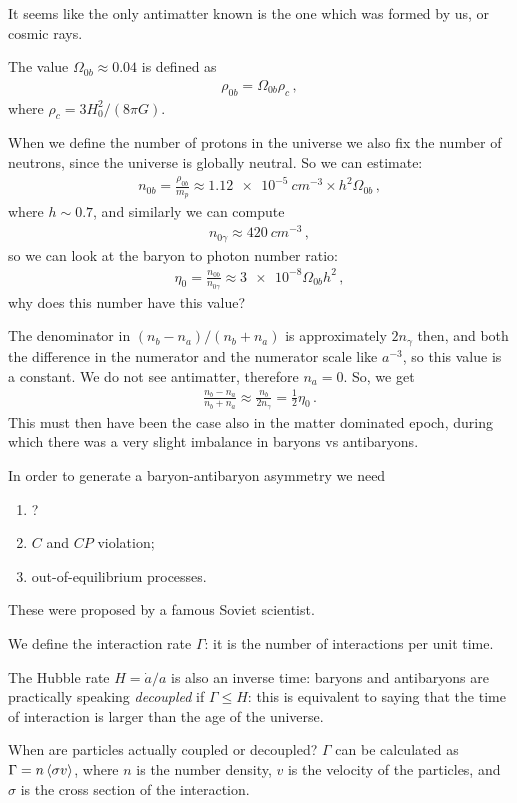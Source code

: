 \documentclass[main.tex]{subfiles}
\begin{document}
It seems like the only antimatter known is the one which was formed by us, or cosmic rays.

The value \(\Omega_{0b} \approx 0.04\) is defined as 
%
\begin{align}
  \rho_{0b} = \Omega_{0b} \rho _{c} 
\,,
\end{align}
%
where \(\rho_c = 3 H_0^2 / (8 \pi G)\).

When we define the number of protons in the universe we also fix the number of neutrons, since the universe is globally neutral.
So we can estimate: 
%
\begin{align}
  n_{0b} = \frac{\rho_{0b}}{m_p} \approx \SI{1.12e-5}{cm^{-3}} \times h^2 \Omega_{0b}
\,,
\end{align}
%
where \(h \sim 0.7\),
and similarly we can compute 
%
\begin{align}
  n_{0 \gamma } \approx \SI{420}{cm^{-3}}
\,,
\end{align}
%
so we can 
look at the baryon to photon number ratio: 
%
\begin{align}
  \eta_0  = \frac{n_{0b}}{n_{0\gamma}}
  \approx \num{3e-8} \Omega_{0b} h^2
\,,
\end{align}
%
why does this number have this value? 

The denominator in \((n_b - n_a) / (n_b + n_a)\) is approximately \(2 n_{\gamma }\) then, and both the difference in the numerator and the numerator scale like \(a^{-3}\), so this value is a constant.
We do not see antimatter, therefore \(n_a = 0\). So, we get 
%
\begin{align}
    \frac{n_b - n_a}{n_b + n_a} \approx \frac{n_b}{2 n_\gamma } = \frac{1}{2} \eta_0 
\,.
\end{align}
%
This must then have been the case also in the matter dominated epoch, during which there was a very slight imbalance in baryons vs antibaryons.

In order to generate a baryon-antibaryon asymmetry we need \begin{enumerate}
    \item ?
    \item \(C\) and \(CP\) violation;
    \item out-of-equilibrium processes.
\end{enumerate}

These were proposed by a famous Soviet scientist.

We define the interaction rate \(\Gamma \): it is the number of interactions per unit time.

The Hubble rate \(H = \dot{a} / a \) is also an inverse time: baryons and antibaryons are practically speaking \emph{decoupled} if \(\Gamma \leq H\): this is equivalent to saying that the time of interaction is larger than the age of the universe.

When are particles actually coupled or decoupled?
\(\Gamma \) can be calculated as \(\Gamma = n \expval{\sigma v}\), where \(n\) is the number density, \(v\) is the velocity of the particles, and \(\sigma \) is the cross section of the interaction.
\end{document}
